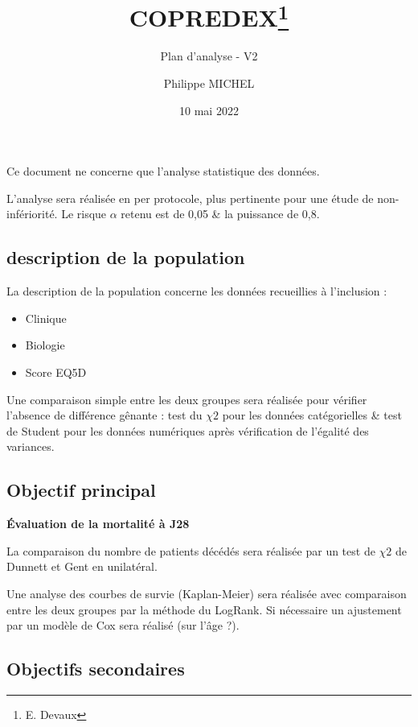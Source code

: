 \documentclass[
]{article}
\title{COPREDEX\thanks{E. Devaux}}
\subtitle{Plan d'analyse - V2}
\author{Philippe MICHEL}
\date{10 mai 2022}
\providecommand{\tightlist}{%
  \setlength{\itemsep}{0pt}\setlength{\parskip}{0pt}}
\begin{document}
\maketitle

{
\setcounter{tocdepth}{2}
\tableofcontents
}
Ce document ne concerne que l'analyse statistique des données.

L'analyse sera réalisée en per protocole, plus pertinente pour une étude
de non-infériorité. Le risque \(\alpha\) retenu est de 0,05 \& la
puissance de 0,8.

\hypertarget{description-de-la-population}{%
\subsection{description de la
population}\label{description-de-la-population}}

La description de la population concerne les données recueillies à
l'inclusion :

\begin{itemize}
\tightlist
\item
  Clinique
\item
  Biologie
\item
  Score EQ5D
\end{itemize}

Une comparaison simple entre les deux groupes sera réalisée pour
vérifier l'absence de différence gênante : test du \(\chi 2\) pour les
données catégorielles \& test de Student pour les données numériques
après vérification de l'égalité des variances.

\hypertarget{objectif-principal}{%
\subsection{Objectif principal}\label{objectif-principal}}

\textbf{Évaluation de la mortalité à J28}

La comparaison du nombre de patients décédés sera réalisée par un test
de \(\chi 2\) de Dunnett et Gent en unilatéral.

Une analyse des courbes de survie (Kaplan-Meier) sera réalisée avec
comparaison entre les deux groupes par la méthode du LogRank. Si
nécessaire un ajustement par un modèle de Cox sera réalisé (sur l'âge
?).

\hypertarget{objectifs-secondaires}{%
\subsection{Objectifs secondaires}\label{objectifs-secondaires}}
\end{document}
